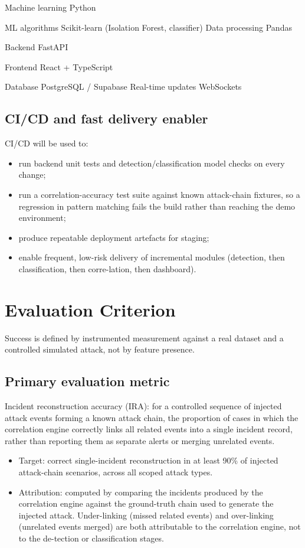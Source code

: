 \documentclass[12pt]{article}
\begin{document}
Machine learning Python

ML algorithms Scikit-learn (Isolation Forest, classifier) Data processing Pandas

Backend FastAPI

Frontend React + TypeScript

Database PostgreSQL / Supabase Real-time updates WebSockets

\subsection{CI/CD and fast delivery enabler}

CI/CD will be used to:

\begin{itemize}
  \item run backend unit tests and detection/classification model checks on every change;
  \item run a correlation-accuracy test suite against known attack-chain fixtures, so a regression in pattern matching fails the build rather than reaching the demo environment;
  \item produce repeatable deployment artefacts for staging;
  \item enable frequent, low-risk delivery of incremental modules (detection, then classification, then corre-lation, then dashboard).
\end{itemize}

\section{Evaluation Criterion}

Success is defined by instrumented measurement against a real dataset and a controlled simulated attack, not by feature presence.

\subsection{Primary evaluation metric}

Incident reconstruction accuracy (IRA): for a controlled sequence of injected attack events forming a known attack chain, the proportion of cases in which the correlation engine correctly links all related events into a single incident record, rather than reporting them as separate alerts or merging unrelated events.

\begin{itemize}
  \item Target: correct single-incident reconstruction in at least 90\% of injected attack-chain scenarios, across all scoped attack types.
  \item Attribution: computed by comparing the incidents produced by the correlation engine against the ground-truth chain used to generate the injected attack. Under-linking (missed related events) and over-linking (unrelated events merged) are both attributable to the correlation engine, not to the de-tection or classification stages.
\end{itemize}
\end{document}
